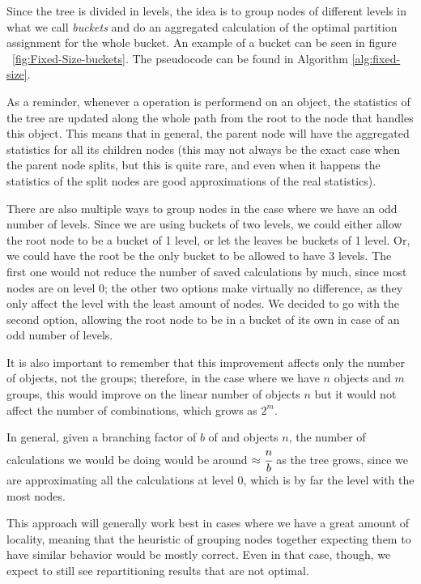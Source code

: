Since the tree is divided in levels, the idea is to group nodes of different levels in what we call \emph{buckets} and do an aggregated calculation of the optimal partition assignment for the whole bucket. An example of a bucket can be seen in figure ~\ref{fig:Fixed-Size-buckets}. The pseudocode can be found in Algorithm \ref{alg:fixed-size}.

As a reminder, whenever a operation is performend on an object, the statistics of the tree are updated along the whole path from the root to the node that handles this object. This means that in general, the parent node will have the aggregated statistics for all its children nodes (this may not always be the exact case when the parent node splits, but this is quite rare, and even when it happens the statistics of the split nodes are good approximations of the real statistics).

There are also multiple ways to group nodes in the case where we have an odd number of levels. Since we are using buckets of two levels, we could either allow the root node to be a bucket of 1 level, or let the leaves be buckets of 1 level. Or, we could have the root be the only bucket to be allowed to have 3 levels. The first one would not reduce the number of saved calculations by much, since most nodes are on level 0; the other two options make virtually no difference, as they only affect the level with the least amount of nodes. We decided to go with the second option, allowing the root node to be in a bucket of its own in case of an odd number of levels.

It is also important to remember that this improvement affects only the number of objects, not the groups; therefore, in the case where we have $n$ objects and $m$ groups, this would improve on the linear number of objects $n$ but it would not affect the number of combinations, which grows as $2^m$.

In general, given a branching factor of $b$ of and objects $n$, the number of calculations we would be doing would be around $\approx\cfrac{n}{b}$ as the tree grows, since we are approximating all the calculations at level 0, which is by far the level with the most nodes.

This approach will generally work best in cases where we have a great amount of locality, meaning that the heuristic of grouping nodes together expecting them to have similar behavior would be mostly correct. Even in that case, though, we expect to still see repartitioning results that are not optimal.

